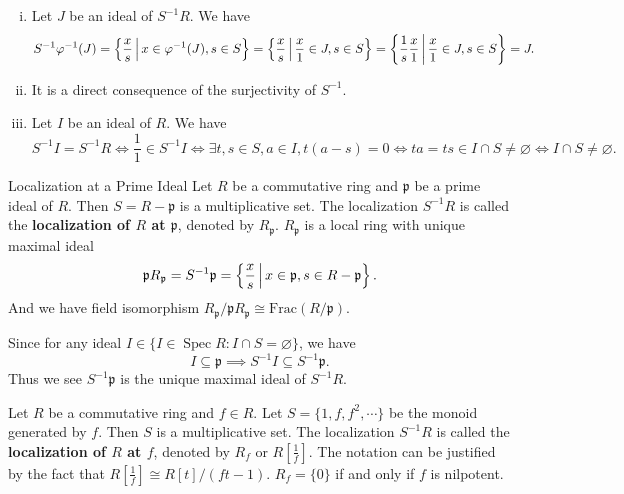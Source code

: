 \begin{prf}
    \begin{enumerate}[(i)]
        \item Let $J$ be an ideal of $S^{-1}R$. We have
        \[
            S^{-1}\varphi^{-1}(J)=\left\{\frac{x}{s}\,\middle\vert\, x\in \varphi^{-1}(J),s\in S\right\}=\left\{\frac{x}{s}\,\middle\vert\, \frac{x}{1}\in J,s\in S\right\}=\left\{\frac{1}{s}\frac{x}{1}\,\middle\vert\, \frac{x}{1}\in J,s\in S\right\}=J.
        \]
        \item It is a direct consequence of the surjectivity of $S^{-1}$.
        \item Let $I$ be an ideal of $R$. We have
        \[
            S^{-1}I=S^{-1}R\iff \frac{1}{1} \in S^{-1}I \iff \exists t,s\in S,a\in I, t(a-s)=0\iff ta=ts\in I\cap S\ne\varnothing \iff I\cap S\ne\varnothing.
        \]
    \end{enumerate}
\end{prf}


\begin{example}{Localization at a Prime Ideal}{}
    Let $R$ be a commutative ring and $\mathfrak{p}$ be a prime ideal of $R$. Then $S=R-\mathfrak{p}$ is a multiplicative set. The localization $S^{-1}R$ is called the \textbf{localization of $R$ at $\mathfrak{p}$}, denoted by $R_\mathfrak{p}$. $R_\mathfrak{p}$ is a local ring with unique maximal ideal 
    \[
    \mathfrak{p}R_\mathfrak{p}=S^{-1}\mathfrak{p}=\left\{\frac{x}{s}\,\middle\vert\, x\in \mathfrak{p}, s\in R-\mathfrak{p}\right\}.
    \]
    And we have field isomorphism $R_\mathfrak{p}/\mathfrak{p}R_\mathfrak{p}\cong \mathrm{Frac}(R/\mathfrak{p})$.
\end{example}

\begin{prf}
    Since for any ideal $I\in  \{I \in \operatorname{Spec} R: I \cap S=\varnothing\}$, we have
    \[
        I\subseteq \mathfrak{p}\implies S^{-1}I\subseteq  S^{-1}\mathfrak{p}.
    \]
    Thus we see $S^{-1}\mathfrak{p}$ is the unique maximal ideal of $S^{-1}R$.
\end{prf}


\begin{example}{}{}
    Let $R$ be a commutative ring and $f\in R$. Let $S=\{1,f,f^2,\cdots\}$ be the monoid generated by $f$. Then $S$ is a multiplicative set. The localization $S^{-1}R$ is called the \textbf{localization of $R$ at $f$}, denoted by $R_f$ or $R\left[\tfrac{1}{f}\right]$. The notation can be justified by the fact that $R\left[\tfrac{1}{f}\right]\cong R\left[t\right]/(ft-1)$.
    $R_f=\{0\}$ if and only if $f$ is nilpotent.
\end{example}

